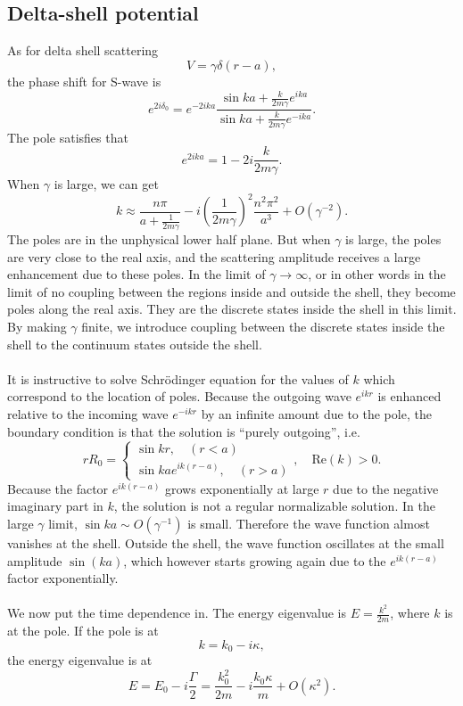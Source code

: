 \subsection{Delta-shell potential}
As for delta shell scattering
\[V = \gamma\delta(r-a),\]
the phase shift for S-wave is
\[e^{2i\delta_0} = e^{-2ika}\frac{\sin ka + \frac{k}{2m\gamma}e^{ika}}{\sin ka + \frac{k}{2m\gamma}e^{-ika}}.\]
The pole satisfies that
\[e^{2ika} = 1 - 2i\frac{k}{2m\gamma}.\]
When $\gamma$ is large, we can get
\[k \approx \frac{n\pi}{a + \frac{1}{2m\gamma}} -i \left(\frac{1}{2m\gamma} \right)^2 \frac{n^2\pi^2}{a^3} + O(\gamma^{-2}).\]
The poles are in the unphysical lower half plane. But when $\gamma$ is large, the poles are very close to the real axis, and the scattering amplitude receives a large enhancement due to these poles. 
In the limit of $\gamma \to \infty$, or in other words in the limit of no coupling between the regions inside and outside the shell, they become poles along the real axis. 
They are the discrete states inside the shell in this limit. 
By making $\gamma$ finite, we introduce coupling between the discrete states inside the shell to the continuum states outside the shell.
\\ \\
It is instructive to solve Schr\"{o}dinger equation for the values of $k$ which correspond to the location of poles. Because the outgoing wave $e^{ikr}$ is enhanced relative to the incoming wave $e^{-ikr}$ by an infinite amount due to the pole, the boundary condition is that the solution is ``purely outgoing'', i.e.
\[rR_0 = \begin{cases} \sin kr , \quad (r<a) \\ \sin ka e^{ik(r-a)} , \quad (r>a)  \end{cases} , \quad \mathrm{Re}(k) > 0.\]
Because the factor $e^{ik(r-a)}$ grows exponentially at large $r$ due to the negative imaginary part in $k$, the solution is not a regular normalizable solution.
In the large $\gamma$ limit, $\sin ka \sim O(\gamma^{-1})$ is small. Therefore the wave function almost vanishes at the shell.
Outside the shell, the wave function oscillates at the small amplitude $\sin(ka)$, which however starts growing again due to the $e^{ik(r-a)}$ factor exponentially.
\\ \\
We now put the time dependence in. The energy eigenvalue
is $E = \frac{k^2}{2m}$, where $k$ is at the pole. If the pole is at
\[k = k_0 - i\kappa,\]
the energy eigenvalue is at
\[E = E_0 - i\frac{\Gamma}{2} = \frac{k_0^2}{2m} - i \frac{k_0\kappa}{m} + O(\kappa^2).\]
